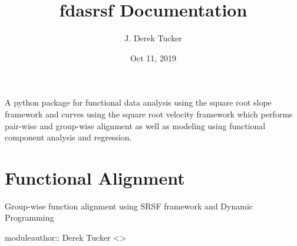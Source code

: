 \documentclass[letterpaper,10pt,english]{sphinxmanual}
\title{fdasrsf Documentation}
\date{Oct 11, 2019}
\author{J. Derek Tucker}
\begin{document}
\pagestyle{empty}
\sphinxmaketitle
\pagestyle{plain}
\sphinxtableofcontents
\pagestyle{normal}
\label{\detokenize{index::doc}}


A python package for functional data analysis using the square root
slope framework and curves using the square root velocity framework
which performs pair-wise and group-wise alignment as well as modeling
using functional component analysis and regression.


\chapter{Functional Alignment}
\label{\detokenize{time_warping:module-time_warping}}\label{\detokenize{time_warping:functional-alignment}}\label{\detokenize{time_warping::doc}}
Group-wise function alignment using SRSF framework and Dynamic Programming

moduleauthor:: Derek Tucker \textless{}\textgreater{}
\end{document}
